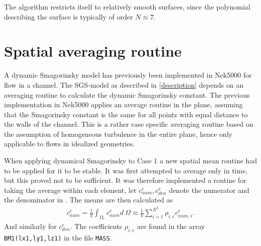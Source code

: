 %
The algorithm restricts itself to relatively smooth surfaces, since the polynomial 
describing the surface is typically of order $N \approx 7$.
%
\section{Spatial averaging routine}
A dynamic Smagorinsky model has previously been implemented in Nek5000 for flow in a channel. 
The SGS-model as described in \cref{description} depends on an averaging routine to calculate
the dynamic Smagorinsky constant. The previous implementation in Nek5000 applies an average routine in the plane,
assuming that the Smagorinsky constant is the same for all points with equal distance to the walls 
of the channel. This is a rather case specific averaging routine based on the assumption of homogeneous turbulence 
in the entire plane, hence only applicable to flows in idealized geometries.

When applying dynamical Smagorinsky to Case 1 a new spatial mean routine had to be applied for it to be stable. 
It was first attempted to average only in time, but this proved not to be sufficient. It was
therefore implemented a routine for taking the average within each element, let 
$c_{num}^e,c_{den}^e$ denote the numerator and the denominator in .
The means are then calculated as 
\begin{align}
    c_{num}^e = \frac{1}{V}\int_{\Omega_e}c_{num}^e d\: \Omega 
    \approx \frac{1}{V}\sum_{i = 1}^{N^3}\rho_{i,e}c_{num,i}^{e}.
    \label{eq:averageroutine}
\end{align}
And similarly for $c_{den}^e$.
The coefficients $\rho_{i,e}$ are found in the array \verb|BM1(lx1,ly1,lz1)| in the file 
\verb|MASS|.
